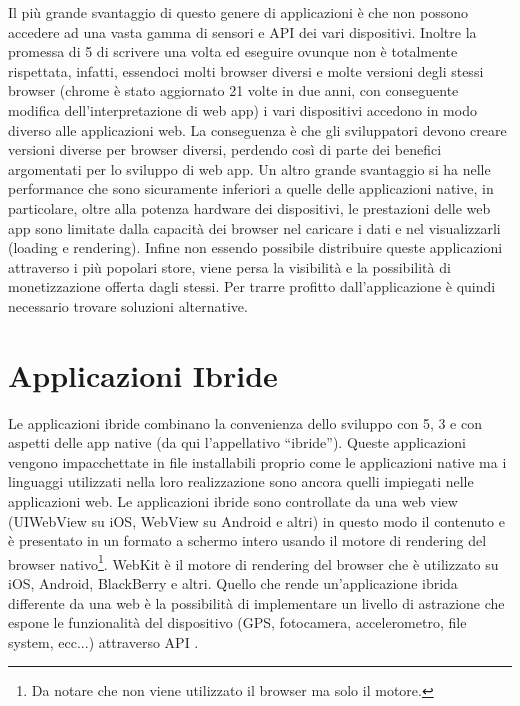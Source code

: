         Il più grande svantaggio di questo genere di applicazioni è che non
        possono accedere ad una vasta gamma di sensori e API dei vari
        dispositivi. Inoltre la promessa di \html{}5 di scrivere una volta ed eseguire
        ovunque non è totalmente rispettata, infatti, essendoci molti \mbox{browser}
        diversi e molte versioni degli stessi \mbox{browser} (chrome è stato aggiornato
        21 volte in due anni, con conseguente modifica dell'interpretazione di
        web app\citep{White:Native-vs-Html}) i vari dispositivi accedono in modo
        diverso alle applicazioni web. La conseguenza è che gli sviluppatori
        devono creare versioni diverse per \mbox{browser} diversi, perdendo così di
        parte dei benefici argomentati per lo sviluppo di web app. Un
        altro grande svantaggio si ha nelle performance che sono sicuramente
        inferiori a quelle delle applicazioni native, in particolare, oltre
        alla potenza hardware dei dispositivi, le prestazioni delle web app
        sono limitate dalla capacità dei \mbox{browser} nel
        caricare i dati e nel visualizzarli (load\-ing e ren\-der\-ing). Infine non
        essendo possibile distribuire queste applicazioni attraverso i più
        popolari \mbox{store}, viene persa la visibilità e la possibilità di
        monetizzazione offerta dagli stessi. Per trarre profitto
        dall'applicazione è quindi necessario trovare soluzioni alternative.

    \section{Applicazioni Ibride}
        Le applicazioni ibride combinano la convenienza dello sviluppo con
        \html{}5,
        \css{}3 e \js{} con aspetti delle app native (da qui l'appellativo
        ``ibride''). Queste applicazioni vengono impacchettate in file
        installabili proprio come le applicazioni native ma i linguaggi
        utilizzati nella loro realizzazione sono ancora quelli impiegati nelle
        applicazioni web. Le applicazioni ibride sono controllate da una web
        view (UIWebView su iOS, WebView su Android e altri) in questo modo il
        contenuto \js{} e \html{} è  presentato in un formato a schermo
        intero usando il motore di ren\-der\-ing del \mbox{browser} nativo\footnote{Da
        notare che non viene utilizzato il \mbox{browser} ma solo il motore.}. WebKit è
        il motore di ren\-der\-ing del \mbox{browser} che è utilizzato su iOS, Android,
        BlackBerry e altri. Quello che rende un'applicazione ibrida differente
        da una web è la possibilità di implementare un livello di astrazione
        che espone le funzionalità del dispositivo (GPS, fotocamera,
        accelerometro, file sys\-tem, ecc...) attraverso API \js{}.

